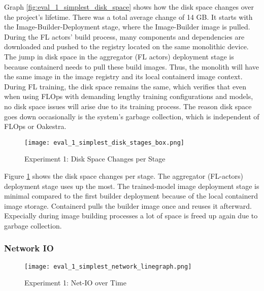Graph \ref{fig:eval_1_simplest_disk_space} shows how the disk space changes over the project's lifetime.
There was a total average change of 14 GB.
It starts with the Image-Builder-Deployment stage, where the Image-Builder image is pulled.
During the FL actors' build process, many components and dependencies are downloaded and pushed to the registry located on the same monolithic device.
The jump in disk space in the aggregator (FL actors) deployment stage is because containerd needs to pull these build images.
Thus, the monolith will have the same image in the image registry and its local containerd image context.
During FL training, the disk space remains the same, which verifies that even when using FLOps with demanding lengthy training configurations and models, no disk space issues will arise due to its training process.
The reason disk space goes down occasionally is the system's garbage collection, which is independent of FLOps or Oakestra.
\begin{figure}[p]
    \begin{adjustwidth}{-0.2\paperwidth}{-0.2\paperwidth}
        \centering
        \texttt{[image: eval\_1\_simplest\_disk\_stages\_box.png]}
        \caption{Experiment 1: Disk Space Changes per Stage}
        \label{fig:eval_1_simplest_disk_space_stages}
    \end{adjustwidth}
\end{figure}
Figure \ref{fig:eval_1_simplest_disk_space_stages} shows the disk space changes per stage.
The aggregator (FL-actors) deployment stage uses up the most.
The trained-model image deployment stage is minimal compared to the first builder deployment because of the local containerd image storage.
Containerd pulls the builder image once and reuses it afterward.
Expecially during image building processes a lot of space is freed up again due to garbage collection.

\subsubsection{Network IO}

\begin{figure}[h]
    \begin{adjustwidth}{-0.2\paperwidth}{-0.2\paperwidth}
        \centering
        \texttt{[image: eval\_1\_simplest\_network\_linegraph.png]}
        \caption{Experiment 1: Net-IO over Time}
        \label{fig:eval_1_simplest_net_io}
    \end{adjustwidth}
\end{figure}

